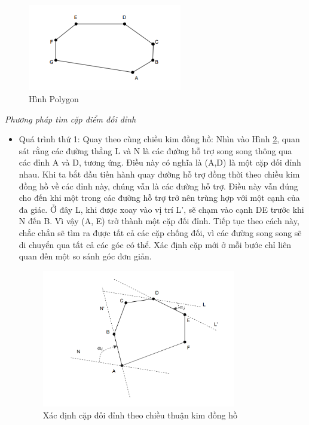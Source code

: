 \begin{itemize}
    \begin{figure}[H]
        \centering
        \includegraphics[width=0.6\textwidth]{chapter4/image/anh1.png}
        \caption{Hình Polygon}
        \label{fig:anh1}
    \end{figure}

\textit{Phương pháp tìm cặp điểm đối đỉnh}
\begin{itemize}
\item Quá trình thứ 1: Quay theo cùng chiều kim đồng hồ:
    Nhìn vào Hình \ref{fig:anh2}, quan sát rằng các đường thẳng L và N là các đường hỗ trợ song song thông qua các đỉnh A và D, tương ứng. Điều này có nghĩa là (A,D) là một cặp đối đỉnh nhau. Khi ta bắt đầu tiến hành quay đường hỗ trợ đồng thời theo chiều kim đồng hồ về các đỉnh này, chúng vẫn là các đường hỗ trợ. Điều này vẫn đúng cho đến khi một trong các đường hỗ trợ trở nên trùng hợp với một cạnh của đa giác. Ở đây L, khi được xoay vào vị trí L', sẽ chạm vào cạnh DE trước khi N đến B. Vì vậy (A, E) trở thành một cặp đối đỉnh. Tiếp tục theo cách này, chắc chắn sẽ tìm ra được tất cả các cặp chống đối, vì các đường song song sẽ di chuyển qua tất cả các góc có thể. Xác định cặp mới ở mỗi bước chỉ liên quan đến một so sánh góc đơn giản.
    \begin{figure}[H]
        \centering
        \includegraphics[width=0.8\textwidth]{chapter4/image/anh2.png}
        \caption{Xác định cặp đối đỉnh theo chiều thuận kim đồng hồ}
        \label{fig:anh2}
    \end{figure}


\end{itemize}
\end{itemize}
